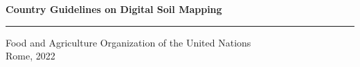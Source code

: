 ﻿\pagestyle{plain}

\afterpage{\blankpage}
\thispagestyle{empty}
\begin{titlepage}
    \begin{center}
        \vspace*{4cm}
        \Large

        \textcolor{astral}{\textbf{Country Guidelines on Digital Soil Mapping\\}}
        \vspace{0.5cm}
        \normalsize
        \vfill
        \noindent
        {\color{astral}\rule{\linewidth}{0.5mm} }

        Food and Agriculture Organization of the United Nations\\
	Rome, 2022
    \end{center}
\end{titlepage}


